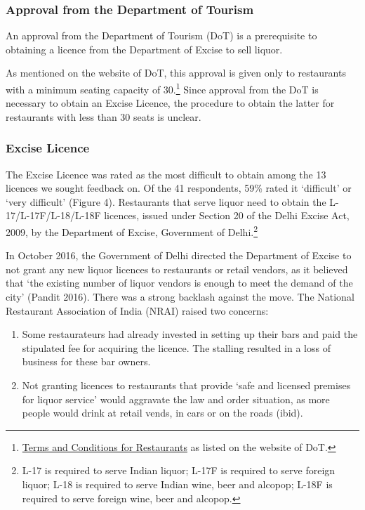 \documentclass[a4paper, 12pt]{article}
\begin{document}
		\subsubsection{Approval from the Department of Tourism}
		An approval from the Department of Tourism (DoT) is a prerequisite to obtaining a licence from the Department of Excise to sell liquor.
		
		As mentioned on the website of DoT, this approval is given only to restaurants with a minimum seating capacity of 30.\footnote{\href{https://bit.ly/2NMdccI}{Terms and Conditions for Restaurants} as listed on the website of DoT.}  Since approval from the 
DoT is necessary to obtain an Excise Licence, the procedure to obtain the latter for restaurants with less than 30 seats is unclear. %
		
		
		\subsubsection{Excise Licence}
		The Excise Licence was rated as the most difficult to obtain among the 13 licences we sought feedback on. Of the 41 respondents, 59\% rated it ‘difficult’ or ‘very difficult’ (Figure 4). Restaurants that serve liquor need to obtain the L-17/L-17F/L-18/L-18F 
licences, issued under Section 20 of the Delhi Excise Act, 2009, by the Department of Excise, Government of Delhi.\footnote{L-17 is required to serve Indian liquor; L-17F is required to serve foreign liquor; L-18 is required to serve Indian wine, beer and alcopop; 
L-18F is required to serve foreign wine, beer and alcopop.}%
		
		In October 2016, the Government of Delhi directed the Department of Excise to not grant any new liquor licences to restaurants or retail vendors, as it believed that ‘the existing number of liquor vendors is enough to meet the demand of the city’ (Pandit 
2016). There was a strong backlash against the move. The National Restaurant Association of India (NRAI) raised two concerns:
		
		\begin {enumerate}
			\item Some restaurateurs had already invested in setting up their bars and paid the stipulated fee for acquiring the licence. The stalling resulted in a loss of business for these bar owners.
			\item Not granting licences to restaurants that provide ‘safe and licensed premises for liquor service’ would aggravate the law and order situation, as more people would drink at retail vends, in cars or on the roads (ibid).
		\end {enumerate}
		
\end{document}
